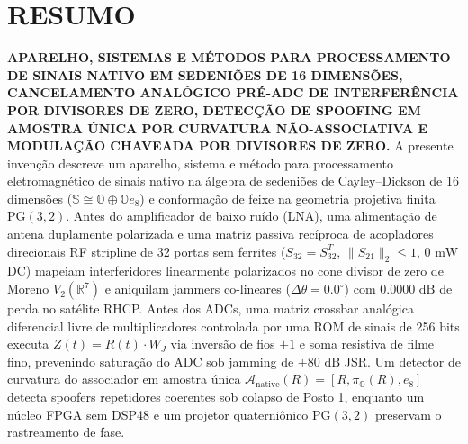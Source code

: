 \documentclass[12pt,a4paper]{article}
\begin{document}
\section*{RESUMO}
\textbf{APARELHO, SISTEMAS E M\'ETODOS PARA PROCESSAMENTO DE SINAIS NATIVO EM SEDENI\~OES DE 16 DIMENS\~OES, CANCELAMENTO ANAL\'OGICO PR\'E-ADC DE INTERFER\^ENCIA POR DIVISORES DE ZERO, DETEC\c{C}\~AO DE SPOOFING EM AMOSTRA \'UNICA POR CURVATURA N\~AO-ASSOCIATIVA E MODULA\c{C}\~AO CHAVEADA POR DIVISORES DE ZERO.} A presente inven\c{c}\~ao descreve um aparelho, sistema e m\'etodo para processamento eletromagn\'etico de sinais nativo na \'algebra de sedeni\~oes de Cayley--Dickson de 16 dimens\~oes ($\mathbb{S} \cong \mathbb{O} \oplus \mathbb{O}e_8$) e conforma\c{c}\~ao de feixe na geometria projetiva finita $\mathrm{PG}(3,2)$. Antes do amplificador de baixo ru\'ido (LNA), uma alimenta\c{c}\~ao de antena duplamente polarizada e uma matriz passiva rec\'iproca de acopladores direcionais RF stripline de 32 portas sem ferrites ($S_{32} = S_{32}^T$, $\|S_{21}\|_2 \le 1$, $0\text{ mW}$ DC) mapeiam interferidores linearmente polarizados no cone divisor de zero de Moreno $V_2(\mathbb{R}^7)$ e aniquilam jammers co-lineares ($\Delta\theta = 0.0^\circ$) com $0.0000\text{ dB}$ de perda no sat\'elite RHCP. Antes dos ADCs, uma matriz crossbar anal\'ogica diferencial livre de multiplicadores controlada por uma ROM de sinais de 256 bits executa $Z(t) = R(t)\cdot W_J$ via invers\~ao de fios $\pm 1$ e soma resistiva de filme fino, prevenindo satura\c{c}\~ao do ADC sob jamming de $+80\text{ dB}$ JSR. Um detector de curvatura do associador em amostra \'unica $\mathcal{A}_{\mathrm{native}}(R) = [R, \pi_{\mathbb{O}}(R), e_8]$ detecta spoofers repetidores coerentes sob colapso de Posto 1, enquanto um n\'ucleo FPGA sem DSP48 e um projetor quaterni\^onico $\mathrm{PG}(3,2)$ preservam o rastreamento de fase.
\end{document}
